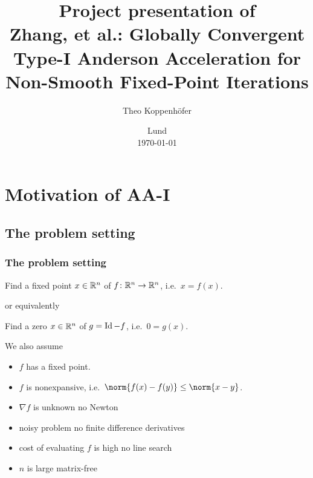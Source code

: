 %




\subject{, VT23}
\title{Project presentation of \\[1ex]
{\large Zhang, et al.: Globally Convergent Type-I Anderson Acceleration for Non-Smooth Fixed-Point Iterations}}
\author{Theo Koppenhöfer}
\date{Lund \\[1ex] \today}











\frame[plain]{\titlepage}



\section{Motivation of AA-I}
\subsection{The problem setting}
\begin{frame}
	\frametitle{The problem setting}
	\begin{problem}
		Find a fixed point $x\in\mathbb{R}^n$ of $f\colon\mathbb{R}^n\to\mathbb{R}^n$, i.e.\ $x=f(x)$.
	\end{problem}
	or equivalently
	\begin{problem}
		Find a zero $x\in\mathbb{R}^n$ of $g=\operatorname{Id}-f$, i.e.\ $0=g(x)$.
	\end{problem}
	We also assume
	\begin{itemize}
		\item $f$ has a fixed point.
		\item $f$ is nonexpansive, i.e.\ $\norm{f(x)-f(y)}\leq\norm{x-y}$.
		\item $\nabla f$ is unknown \textrightarrow no Newton
		\item noisy problem \textrightarrow no finite difference derivatives
		\item cost of evaluating $f$ is high \textrightarrow no line search
		\item $n$ is large \textrightarrow matrix-free
	\end{itemize}
\end{frame}


